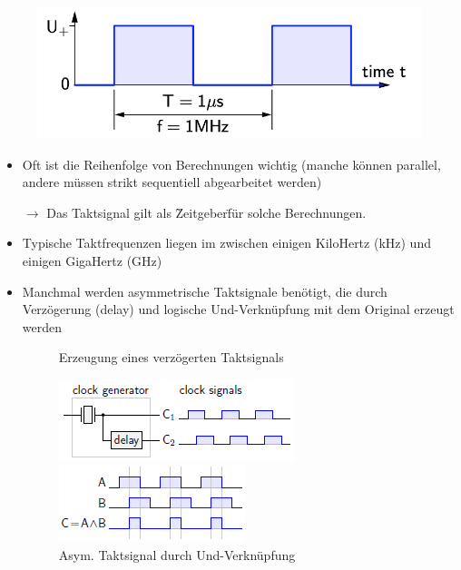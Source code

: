 \documentclass[12pt]{report}
\begin{document}
\begin{figure}[H]
\begin{minipage}[t]{0.45\textwidth}
    \begin{center}
      \includegraphics[width=\textwidth]{taktsignal_02}
    \end{center}
  \end{minipage}
\end{figure}

\begin{infobox}
  \begin{itemize}
    \item Oft ist die Reihenfolge von Berechnungen wichtig (manche können parallel, andere müssen strikt sequentiell abgearbeitet werden)
          \par $\rightarrow$ Das Taktsignal gilt als \"Zeitgeber\" für solche Berechnungen.
    \item Typische Taktfrequenzen liegen im zwischen einigen KiloHertz (kHz) und einigen GigaHertz (GHz)
    \item Manchmal werden asymmetrische Taktsignale benötigt, die durch Verzögerung (delay) und logische Und-Verknüpfung mit dem Original erzeugt werden
          \begin{figure}[H]
            \begin{minipage}[t]{0.45\textwidth}
              \caption{Erzeugung eines verzögerten Taktsignals}
              \begin{center}
                \includegraphics{taktsignal_asymmetrisch}
              \end{center}
            \end{minipage}
            \hfill
            \begin{minipage}[t]{0.45\textwidth}
              \caption{Asym. Taktsignal durch Und-Verknüpfung}
              \begin{center}
                \includegraphics{taktsignal_asymmetrisch_02}
              \end{center}
            \end{minipage}
          \end{figure}
  \end{itemize}
\end{infobox}
\end{document}
